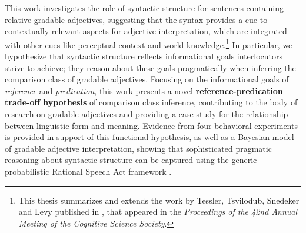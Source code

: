This work investigates the role of syntactic structure for sentences containing relative gradable adjectives, suggesting that the syntax provides a cue to contextually relevant aspects for adjective interpretation, which are integrated with other cues like perceptual context and world knowledge.\footnote{This thesis summarizes and extends the work by Tessler, Tsvilodub, Snedeker and Levy published in \textcite{tessler2020}, that appeared in the \textit{Proceedings of the 42nd Annual Meeting of the Cognitive Science Society}.} In particular, we hypothesize that syntactic structure reflects informational goals interlocutors strive to achieve; they reason about these goals pragmatically when inferring the comparison class of gradable adjectives. Focusing on the informational goals of \textit{reference} and \textit{predication}, this work presents a novel \textbf{reference-predication trade-off hypothesis} of comparison class inference, contributing to the body of research on gradable adjectives and providing a case study for the relationship between linguistic form and meaning. Evidence from four behavioral experiments is provided in support of this functional hypothesis, as well as a Bayesian model of gradable adjective interpretation, showing that sophisticated pragmatic reasoning about syntactic structure can be captured using the generic probabilistic Rational Speech Act framework \parencite{goodman2016}. 
	

